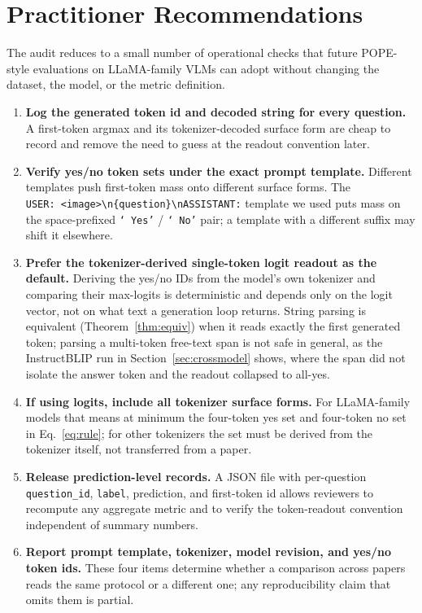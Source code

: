 \documentclass[11pt,letterpaper]{article}
\begin{document}
\section{Practitioner Recommendations}
\label{sec:recs}

The audit reduces to a small number of operational checks that future
POPE-style evaluations on LLaMA-family VLMs can adopt without changing
the dataset, the model, or the metric definition.

\begin{enumerate}[leftmargin=*,nosep]
\item \textbf{Log the generated token id and decoded string for every
      question.} A first-token argmax and its tokenizer-decoded surface
      form are cheap to record and remove the need to guess at the
      readout convention later.
\item \textbf{Verify yes/no token sets under the exact prompt
      template.} Different templates push first-token mass onto
      different surface forms. The
      \texttt{USER:~<image>\textbackslash n\{question\}\textbackslash nASSISTANT:}
      template we used puts mass on the space-prefixed
      \texttt{`\,Yes'} / \texttt{`\,No'} pair; a template with a
      different suffix may shift it elsewhere.
\item \textbf{Prefer the tokenizer-derived single-token logit readout
      as the default.} Deriving the yes/no IDs from the model's own
      tokenizer and comparing their max-logits is deterministic and
      depends only on the logit vector, not on what text a generation
      loop returns. String parsing is equivalent
      (Theorem~\ref{thm:equiv}) when it reads exactly the first
      generated token; parsing a multi-token free-text span is not safe
      in general, as the InstructBLIP run in
      Section~\ref{sec:crossmodel} shows, where the span did not isolate
      the answer token and the readout collapsed to all-yes.
\item \textbf{If using logits, include all tokenizer surface forms.}
      For LLaMA-family models that means at minimum the four-token
      yes set and four-token no set in Eq.~\ref{eq:rule}; for other
      tokenizers the set must be derived from the tokenizer itself,
      not transferred from a paper.
\item \textbf{Release prediction-level records.} A JSON file with
      per-question \texttt{question\_id}, \texttt{label}, prediction,
      and first-token id allows reviewers to recompute any aggregate
      metric and to verify the token-readout convention independent of
      summary numbers.
\item \textbf{Report prompt template, tokenizer, model revision, and
      yes/no token ids.} These four items determine whether a
      comparison across papers reads the same protocol or a different
      one; any reproducibility claim that omits them is partial.
\end{enumerate}
\end{document}
